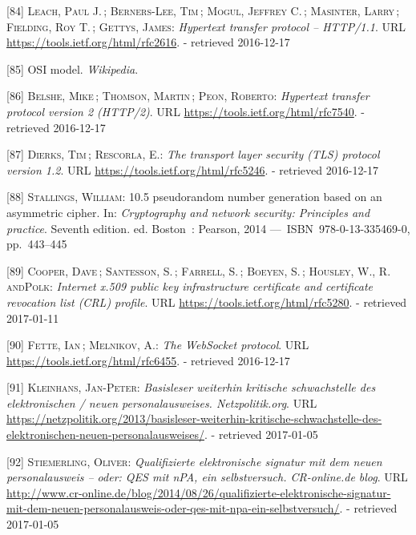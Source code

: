 \documentclass[12pt,english,a4paper,titlepage,cleardoublepage=empty,dottedtoc]{report}
\begin{document}
\hypertarget{ref-web_spec_http1}{}
{[}84{]} \textsc{Leach, Paul J.}\,; \textsc{Berners-Lee, Tim}\,;
\textsc{Mogul, Jeffrey C.}\,; \textsc{Masinter, Larry}\,;
\textsc{Fielding, Roy T.}\,; \textsc{Gettys, James}: \emph{Hypertext
transfer protocol -- HTTP/1.1}. URL
\url{https://tools.ietf.org/html/rfc2616}. - retrieved 2016-12-17

\hypertarget{ref-web_2017_wikipedia_osi-model}{}
{[}85{]} OSI model. \emph{Wikipedia}.

\hypertarget{ref-web_spec_http2}{}
{[}86{]} \textsc{Belshe, Mike}\,; \textsc{Thomson, Martin}\,;
\textsc{Peon, Roberto}: \emph{Hypertext transfer protocol version 2
(HTTP/2)}. URL \url{https://tools.ietf.org/html/rfc7540}. - retrieved
2016-12-17

\hypertarget{ref-web_spec_tls}{}
{[}87{]} \textsc{Dierks, Tim}\,; \textsc{Rescorla, E.}: \emph{The
transport layer security (TLS) protocol version 1.2}. URL
\url{https://tools.ietf.org/html/rfc5246}. - retrieved 2016-12-17

\hypertarget{ref-book_2014_chapter-14-5-pki}{}
{[}88{]} \textsc{Stallings, William}: 10.5 pseudorandom number
generation based on an asymmetric cipher. In: \emph{Cryptography and
network security: Principles and practice}. Seventh edition. ed.
Boston~: Pearson, 2014 ---~ISBN~978-0-13-335469-0, pp.~443--445

\hypertarget{ref-web_spec_x509}{}
{[}89{]} \textsc{Cooper, Dave}\,; \textsc{Santesson, S.}\,;
\textsc{Farrell, S.}\,; \textsc{Boeyen, S.}\,; \textsc{Housley, W.,
\textnormal{R. andPolk}}: \emph{Internet x.509 public key infrastructure
certificate and certificate revocation list (CRL) profile}. URL
\url{https://tools.ietf.org/html/rfc5280}. - retrieved 2017-01-11

\hypertarget{ref-web_spec_websockets}{}
{[}90{]} \textsc{Fette, Ian}\,; \textsc{Melnikov, A.}: \emph{The
WebSocket protocol}. URL \url{https://tools.ietf.org/html/rfc6455}. -
retrieved 2016-12-17

\hypertarget{ref-web_2013_npa-sicherheitsdefizit}{}
{[}91{]} \textsc{Kleinhans, Jan-Peter}: \emph{Basisleser weiterhin
kritische schwachstelle des elektronischen / neuen personalausweises.
Netzpolitik.org}. URL
\url{https://netzpolitik.org/2013/basisleser-weiterhin-kritische-schwachstelle-des-elektronischen-neuen-personalausweises/}.
- retrieved 2017-01-05

\hypertarget{ref-web_2014_test-qes-support-in-npa}{}
{[}92{]} \textsc{Stiemerling, Oliver}: \emph{Qualifizierte elektronische
signatur mit dem neuen personalausweis -- oder: QES mit nPA, ein
selbstversuch. CR-online.de blog}. URL
\url{http://www.cr-online.de/blog/2014/08/26/qualifizierte-elektronische-signatur-mit-dem-neuen-personalausweis-oder-qes-mit-npa-ein-selbstversuch/}.
- retrieved 2017-01-05
\end{document}

